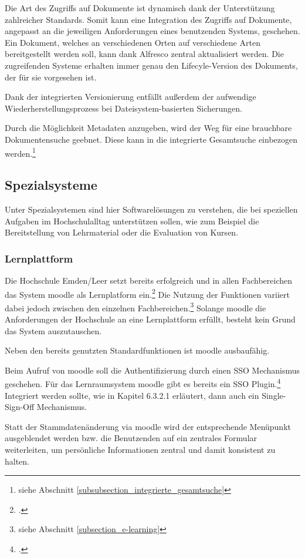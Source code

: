 Die Art des Zugriffs auf Dokumente ist dynamisch dank der Unterstützung zahlreicher Standards. Somit kann eine Integration des Zugriffs auf Dokumente, angepasst an die jeweiligen Anforderungen eines benutzenden Systems, geschehen. Ein Dokument, welches an verschiedenen Orten auf verschiedene Arten bereitgestellt werden soll, kann dank Alfresco zentral aktualisiert werden. Die zugreifenden Systeme erhalten immer genau den Lifecyle-Version des Dokuments, der für sie vorgesehen ist.

Dank der integrierten Versionierung entfällt außerdem der aufwendige Wiederherstellungsprozess bei Dateisystem-basierten Sicherungen.

Durch die Möglichkeit Metadaten anzugeben, wird der Weg für eine brauchbare Dokumentensuche geebnet. 
Diese kann in die integrierte Gesamtsuche einbezogen werden.\footnote{siehe Abschnitt \ref{subsubsection_integrierte_gesamtsuche}}

\subsection{Spezialsysteme}
Unter Spezialsystemen sind hier Softwarelösungen zu verstehen, die bei speziellen Aufgaben im Hochschulalltag unterstützen sollen, wie zum Beispiel die Bereitstellung von Lehrmaterial oder die Evaluation von Kursen.

\subsubsection{Lernplattform}
Die Hochschule Emden/Leer setzt bereits erfolgreich und in allen Fachbereichen das System moodle als Lernplatform ein.\footcite{gunter_muller_interview} 
Die Nutzung der Funktionen variiert dabei jedoch zwischen den einzelnen Fachbereichen.\footnote{siehe Abschnitt \ref{subsection_e-learning}}
Solange moodle die Anforderungen der Hochschule an eine Lernplattform erfüllt, besteht kein Grund das System auszutauschen.

Neben den bereits genutzten Standardfunktionen ist moodle ausbaufähig.

Beim Aufruf von moodle soll die Authentifizierung durch einen SSO Mechanismus geschehen. Für das Lernraumsystem moodle gibt es bereits ein SSO Plugin.\footcite{macklin_moodle_sso_plugin} Integriert werden sollte, wie in Kapitel 6.3.2.1 erläutert, dann auch ein Single-Sign-Off Mechanismus.

Statt der Stammdatenänderung via moodle wird der entsprechende Menüpunkt ausgeblendet werden bzw. die Benutzenden auf ein zentrales Formular weiterleiten, um persönliche Informationen zentral und damit konsistent zu halten.

